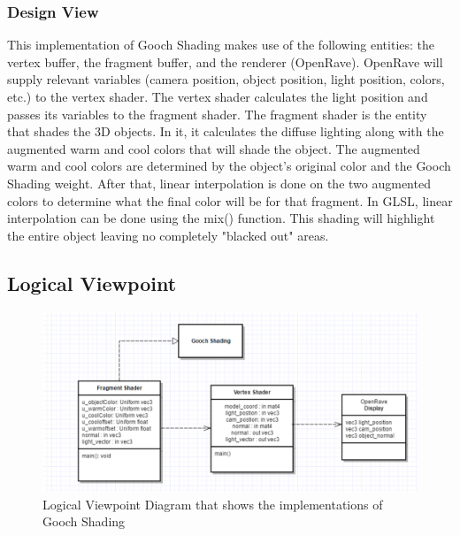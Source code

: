 \documentclass[10pt,journal,compsoc,draftclsnofoot]{IEEEtran}
\begin{document}
\begin{flushleft}
\subsubsection{Design View}
This implementation of Gooch Shading makes use of the following entities: the vertex buffer, the fragment buffer, and the renderer (OpenRave). 
OpenRave will supply relevant variables (camera position, object position, light position, colors, etc.) to the vertex shader.
The vertex shader calculates the light position and passes its variables to the fragment shader.
The fragment shader is the entity that shades the 3D objects.
In it, it calculates the diffuse lighting along with the augmented warm and cool colors that will shade the object.
The augmented warm and cool colors are determined by the object’s original color and the Gooch Shading weight.
After that, linear interpolation is done on the two augmented colors to determine what the final color will be for that fragment.
In GLSL, linear interpolation can be done using the mix() function.
This shading will highlight the entire object leaving no completely "blacked out" areas.

\newpage

\subsection{Logical Viewpoint}

\begin{figure} [H]
  \includegraphics[scale=0.8]{Gooch_Shading_composition.eps}
  \caption
{ \newline \hspace{\linewidth}
Logical Viewpoint Diagram that shows the implementations of Gooch Shading}
  \label{fig:Gooch_Shading_composition}
\end{figure}


\end{flushleft}
\end{document}
